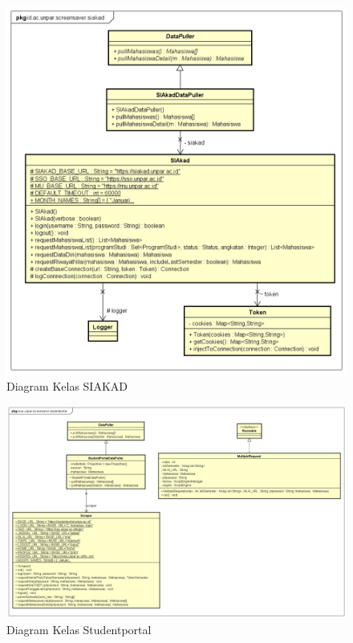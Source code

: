 \begin{figure}[h]
	\centering
	\includegraphics[scale=0.45]{Gambar/ClassDiagram_siakad.png}
	\caption{Diagram Kelas SIAKAD}
	\label{fig:4_class_diagram_siakad}
\end{figure}

\begin{figure}[h]
	\centering
	\includegraphics[scale=0.34]{Gambar/ClassDiagram_stupor.png}
	\caption{Diagram Kelas Studentportal}
	\label{fig:4_class_diagram_stupor}
\end{figure}

